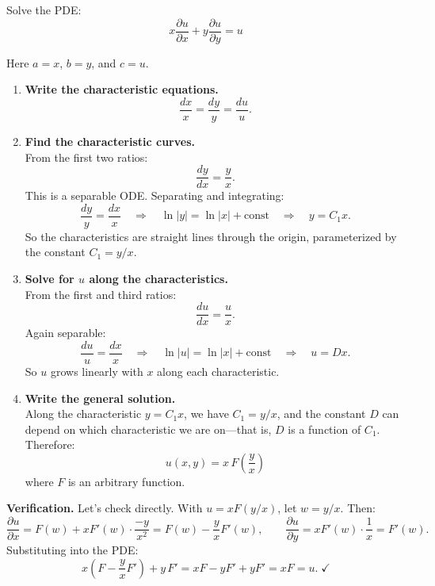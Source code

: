 \exampleline
\begin{example}
Solve the PDE:
\[
x \frac{\partial u}{\partial x} + y \frac{\partial u}{\partial y} = u
\]

\begin{solution}
Here \( a = x \), \( b = y \), and \( c = u \).

\begin{enumerate}
    \item \textbf{Write the characteristic equations.} \\
    \[
    \frac{dx}{x} = \frac{dy}{y} = \frac{du}{u}.
    \]

    \item \textbf{Find the characteristic curves.} \\
    From the first two ratios:
    \[
    \frac{dy}{dx} = \frac{y}{x}.
    \]
    This is a separable ODE. Separating and integrating:
    \[
    \frac{dy}{y} = \frac{dx}{x} \quad \Longrightarrow \quad \ln|y| = \ln|x| + \text{const} \quad \Longrightarrow \quad y = C_1 x.
    \]
    So the characteristics are straight lines through the origin, parameterized by the constant \( C_1 = y/x \).

    \item \textbf{Solve for \( u \) along the characteristics.} \\
    From the first and third ratios:
    \[
    \frac{du}{dx} = \frac{u}{x}.
    \]
    Again separable:
    \[
    \frac{du}{u} = \frac{dx}{x} \quad \Longrightarrow \quad \ln|u| = \ln|x| + \text{const} \quad \Longrightarrow \quad u = Dx.
    \]
    So \( u \) grows linearly with \( x \) along each characteristic.

    \item \textbf{Write the general solution.} \\
    Along the characteristic \( y = C_1 x \), we have \( C_1 = y/x \), and the constant \( D \) can depend on which characteristic we are on---that is, \( D \) is a function of \( C_1 \). Therefore:
    \[
    \boxed{u(x,y) = x\, F\!\left(\frac{y}{x}\right)}
    \]
    where \( F \) is an arbitrary function.
\end{enumerate}

\noindent \textbf{Verification.} Let's check directly. With \( u = xF(y/x) \), let \( w = y/x \). Then:
    \[
    \frac{\partial u}{\partial x} = F(w) + x F'(w) \cdot \frac{-y}{x^2} = F(w) - \frac{y}{x} F'(w), \qquad
    \frac{\partial u}{\partial y} = x F'(w) \cdot \frac{1}{x} = F'(w).
    \]
    Substituting into the PDE:
    \[
    x \left( F - \frac{y}{x} F' \right) + y \, F' = xF - yF' + yF' = xF = u. \;\checkmark
    \]
\end{solution}
\end{example}
